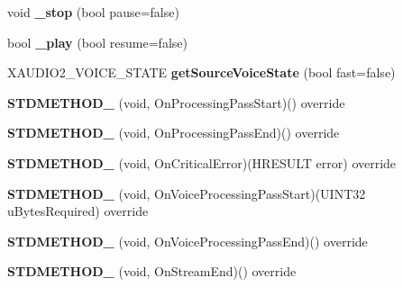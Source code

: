 \begin{DoxyCompactItemize}
void {\bfseries \+\_\+stop} (bool pause=false)
\item 
\mbox{\label{classexperimental_1_1AudioPlayer_a5d48bdfb1ef4ad8ce489b330fb84b879}} 
bool {\bfseries \+\_\+play} (bool resume=false)
\item 
\mbox{\label{classexperimental_1_1AudioPlayer_acb1cc209ebfaa9f257b819845ed70125}} 
X\+A\+U\+D\+I\+O2\+\_\+\+V\+O\+I\+C\+E\+\_\+\+S\+T\+A\+TE {\bfseries get\+Source\+Voice\+State} (bool fast=false)
\item 
\mbox{\label{classexperimental_1_1AudioPlayer_a7af1db2fe701250c8859557e967b1cb7}} 
{\bfseries S\+T\+D\+M\+E\+T\+H\+O\+D\+\_\+} (void, On\+Processing\+Pass\+Start)() override
\item 
\mbox{\label{classexperimental_1_1AudioPlayer_a38427dd0f09e9105752137f17373952c}} 
{\bfseries S\+T\+D\+M\+E\+T\+H\+O\+D\+\_\+} (void, On\+Processing\+Pass\+End)() override
\item 
\mbox{\label{classexperimental_1_1AudioPlayer_ad86be9c7d73bc1db493d5517836201c6}} 
{\bfseries S\+T\+D\+M\+E\+T\+H\+O\+D\+\_\+} (void, On\+Critical\+Error)(H\+R\+E\+S\+U\+LT error) override
\item 
\mbox{\label{classexperimental_1_1AudioPlayer_ab2e4a4506605185493e6c4f429e08f6e}} 
{\bfseries S\+T\+D\+M\+E\+T\+H\+O\+D\+\_\+} (void, On\+Voice\+Processing\+Pass\+Start)(U\+I\+N\+T32 u\+Bytes\+Required) override
\item 
\mbox{\label{classexperimental_1_1AudioPlayer_a3227be7b917885b22884c3eda0aadb0b}} 
{\bfseries S\+T\+D\+M\+E\+T\+H\+O\+D\+\_\+} (void, On\+Voice\+Processing\+Pass\+End)() override
\item 
\mbox{\label{classexperimental_1_1AudioPlayer_a07615bfee2c35a30c02884a86ffd8e24}} 
{\bfseries S\+T\+D\+M\+E\+T\+H\+O\+D\+\_\+} (void, On\+Stream\+End)() override
\item 
\mbox{\label{classexperimental_1_1AudioPlayer_a672ca51643c3c97bec6817921d085610}} 

\end{DoxyCompactItemize}
